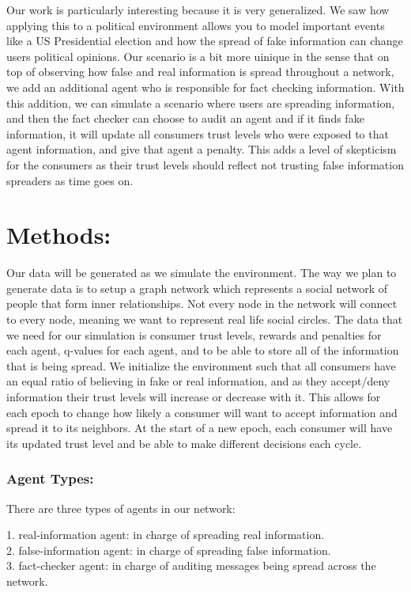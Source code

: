 \documentclass[twoside]{article}
\begin{document}
Our work is particularly interesting because it is very generalized. We saw how applying this to a political environment allows you to model important events like a US Presidential election and how the spread of fake information can change users political opinions. Our scenario is a bit more uinique in the sense that on top of observing how false and real information is spread throughout a network, we add an additional agent who is responsible for fact checking information. With this addition, we can simulate a scenario where users are spreading information, and then the fact checker can choose to audit an agent and if it finds fake information, it will update all consumers trust levels who were exposed to that agent information, and give that agent a penalty. This adds a level of skepticism for the consumers as their trust levels should reflect not trusting false information spreaders as time goes on.

\section{Methods: }
Our data will be generated as we simulate the environment. The way we plan to generate data is to setup a graph network which represents a social network of people that form inner relationships. Not every node in the network will connect to every node, meaning we want to represent real life social circles. The data that we need for our simulation is consumer trust levels, rewards and penalties for each agent, q-values for each agent, and to be able to store all of the information that is being spread. We initialize the environment such that all consumers have an equal ratio of believing in fake or real information, and as they accept/deny information their trust levels will increase or decrease with it. This allows for each epoch to change how likely a consumer will want to accept information and spread it to its neighbors. At the start of a new epoch, each consumer will have its updated trust level and be able to make different decisions each cycle.

\subsubsection{Agent Types:}
There are three types of agents in our network:

1. real-information agent: in charge of spreading real information.\\
2. false-information agent: in charge of spreading false information.\\
3. fact-checker agent: in charge of auditing messages being spread across the network.\\
\end{document}
